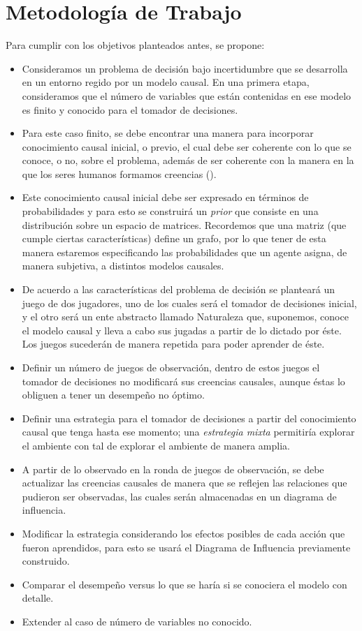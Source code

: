 \documentclass[11pt]{article}
\theoremstyle{plain}
\begin{document}
\section{Metodología de Trabajo}
Para cumplir con los objetivos planteados antes, se propone:
\begin{itemize}
\item Consideramos un problema de decisión bajo incertidumbre que se desarrolla en un entorno regido por un modelo causal. En una primera etapa, consideramos que el número de variables que están contenidas en ese modelo es finito y conocido para el tomador de decisiones.
\item Para este caso finito, se debe encontrar una manera para incorporar conocimiento causal inicial, o previo, el cual debe ser coherente con lo que se conoce, o no, sobre el problema, además de ser coherente con la manera en la que los seres humanos formamos creencias (\cite{larrouy2017mindreading}).
\item Este conocimiento causal inicial debe ser expresado en términos de probabilidades y para esto se construirá un \textit{prior} que consiste en una distribución sobre un espacio de matrices. Recordemos que una matriz (que cumple ciertas características) define un grafo, por lo que tener de esta manera estaremos especificando las probabilidades que un agente asigna, de manera subjetiva, a distintos modelos causales. 
\item De acuerdo a las características del problema de decisión se planteará un juego de dos jugadores, uno de los cuales será el tomador de decisiones inicial, y el otro será un ente abstracto llamado Naturaleza que, suponemos, conoce el modelo causal y lleva a cabo sus jugadas a partir de lo dictado por éste. Los juegos sucederán de manera repetida para poder aprender de éste.
\item Definir un número de juegos de observación, dentro de estos juegos el tomador de decisiones no modificará sus creencias causales, aunque éstas lo obliguen a tener un desempeño no óptimo.
\item Definir una estrategia para el tomador de decisiones a partir del conocimiento causal que tenga hasta ese momento; una \textit{estrategia mixta} permitiría explorar el ambiente con tal de explorar el ambiente de manera amplia.
\item A partir de lo observado en la ronda de juegos de observación, se debe actualizar las creencias causales de manera que se reflejen las relaciones que pudieron ser observadas, las cuales serán almacenadas en un diagrama de influencia.
\item Modificar la estrategia considerando los efectos posibles de cada acción que fueron aprendidos, para esto se usará el Diagrama de Influencia previamente construido. 
\item Comparar el desempeño versus lo que se haría si se conociera el modelo con detalle.
\item Extender al caso de número de variables no conocido.
\end{itemize}


\end{document}
